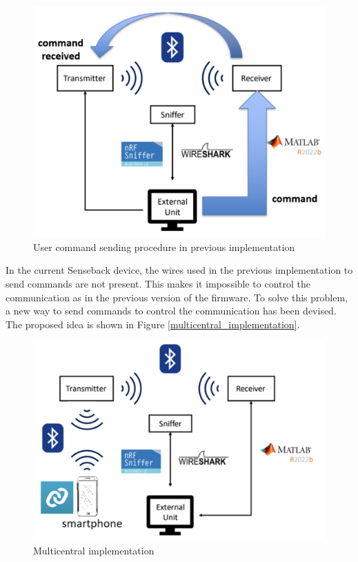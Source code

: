 \documentclass{Configuration_Files/PoliMi3i_thesis}
\begin{document}
\begin{figure}[H]
    \centering
    \includegraphics[scale=0.5]{Multicentral/1.png}
    \caption{User command sending procedure in previous implementation}
    \label{multicentral_1}
\end{figure}

In the current Senseback device, the wires used in the previous implementation to send commands are not present. This makes it impossible to control the communication as in the previous version of the firmware. To solve this problem, a new way to send commands to control the communication has been devised. The proposed idea is shown in Figure \ref{multicentral_implementation}.


\begin{figure}[H]
    \centering
    \includegraphics[scale=0.5]{Multicentral/2.png}
    \caption{Multicentral implementation}
    \label{multicentral_2}
\end{figure}
\end{document}
